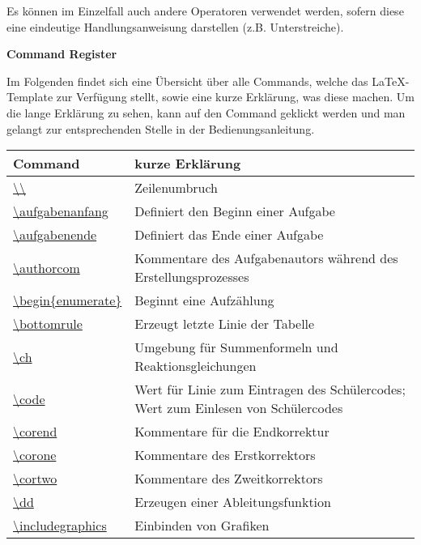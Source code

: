\documentclass[./main.tex]{subfiles}
\begin{document}
Es k\"onnen im Einzelfall auch andere Operatoren verwendet werden, sofern diese eine eindeutige Handlungsanweisung darstellen (z.B. Unterstreiche). 

\newpage
{\Large \textbf{Command Register}}\par
Im Folgenden findet sich eine \"Ubersicht \"uber alle Commands, welche das \LaTeX -Template zur Verf\"ugung stellt, sowie eine kurze Erkl\"arung, was diese machen. Um die lange Erkl\"arung zu sehen, kann auf den Command geklickt werden und man gelangt zur entsprechenden Stelle in der Bedienungsanleitung.\\
\begin{tabularx}{\linewidth}{|l|X|}
\hline
Command&kurze Erkl\"arung\hfill\\\hline
    \hyperlink{textbackslash}{\textbackslash{}\textbackslash{}}&Zeilenumbruch\\\hline
    \hyperlink{aufgabenanfang}{\textbackslash{}aufgabenanfang}&Definiert den Beginn einer Aufgabe\\\hline
    \hyperlink{aufgabenende}{\textbackslash{}aufgabenende}&Definiert das Ende einer Aufgabe\\\hline
    \hyperlink{authorcom}{\textbackslash{}authorcom}&Kommentare des Aufgabenautors w\"ahrend des Erstellungsprozesses\\\hline
    \hyperlink{beginenumerate}{\textbackslash{}begin\{enumerate\}}&Beginnt eine Aufz\"ahlung\\\hline
    \hyperlink{bottomrule}{\textbackslash{}bottomrule}&Erzeugt letzte Linie der Tabelle\\\hline
    \hyperlink{ch}{\textbackslash{}ch}&Umgebung f\"ur Summenformeln und Reaktionsgleichungen\\\hline
    \hyperlink{code}{\textbackslash{}code}&Wert \glqq 0\grqq{} f\"ur Linie zum Eintragen des Sch\"ulercodes; Wert \glqq 1\grqq{} zum Einlesen von Sch\"ulercodes\\\hline
    \hyperlink{corend}{\textbackslash{}corend}&Kommentare f\"ur die Endkorrektur\\\hline
    \hyperlink{corone}{\textbackslash{}corone}&Kommentare des Erstkorrektors\\\hline
    \hyperlink{cortwo}{\textbackslash{}cortwo}&Kommentare des Zweitkorrektors\\\hline
    \hyperlink{dd}{\textbackslash{}dd}&Erzeugen einer Ableitungsfunktion\\\hline
    \hyperlink{includegraphics}{\textbackslash{}includegraphics}&Einbinden von Grafiken\\\hline

\end{tabularx}
\end{document}
